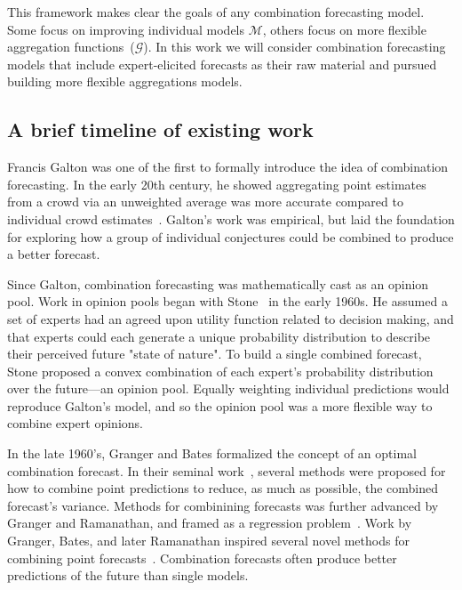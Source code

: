 \documentclass[preprint,authoryear]{elsarticle}
\begin{document}
This framework makes clear the goals of any combination forecasting model.
Some focus on improving individual models $\mathcal{M}$, others focus on more flexible aggregation functions~($\mathcal{G}$).
In this work we will consider combination forecasting models that include expert-elicited forecasts as their raw material and pursued building more flexible aggregations models.

\subsection{A brief timeline of existing work}

Francis Galton was one of the first to formally introduce the idea of combination forecasting. 
In the early 20th century, he showed aggregating point estimates from a crowd via an unweighted average was more accurate compared to individual crowd estimates~\citep{galton1907vox}.
Galton's work was empirical, but laid the foundation for exploring how a group of individual conjectures could be combined to produce a better forecast. 

Since Galton, combination forecasting was mathematically cast as an opinion pool.
Work in opinion pools began with Stone~\citep{stone1961opinion} in the early 1960s.
He assumed a set of experts had an agreed upon utility function related to decision making, and that experts could each generate a unique probability distribution to describe their perceived future "state of nature".
To build a single combined forecast, Stone proposed a convex combination of each expert's probability distribution over the future---an opinion pool.
Equally weighting individual predictions would reproduce Galton's model, and so the opinion pool was a more flexible way to combine expert opinions.

In the late 1960's, Granger and Bates formalized the concept of an optimal combination forecast.
In their seminal work~\citep{bates1969combination}, several methods were proposed for how to combine point predictions to reduce, as much as possible, the combined forecast's variance.
Methods for combinining forecasts was further advanced by Granger and Ramanathan, and framed as a regression problem~\citep{granger1984improved}.
Work by Granger, Bates, and later Ramanathan inspired several novel methods for combining point forecasts~\citep{gneiting2013combining,hora2015calibration,cooke1991experts,wallis2011combining}.
Combination forecasts often produce better predictions of the future than single models.
\end{document}
